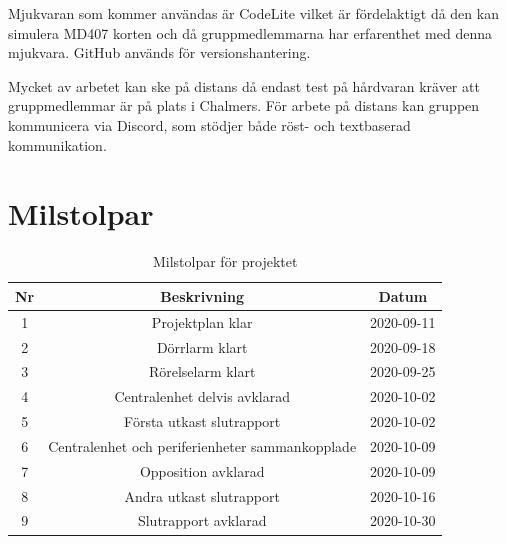 \documentclass[a4paper]{article}
\begin{document}
Mjukvaran som kommer användas är CodeLite vilket är fördelaktigt då den kan simulera MD407 korten och då gruppmedlemmarna har erfarenthet med denna mjukvara. GitHub används för versionshantering.

Mycket av arbetet kan ske på distans då endast test på hårdvaran kräver att gruppmedlemmar är på plats i Chalmers. För arbete på distans kan gruppen kommunicera via Discord, som stödjer både röst- och textbaserad kommunikation.

\section{Milstolpar}


\begin{table}[H]
    \centering
        \begin{tabular}{ |c|c|c| }\hline
            Nr & Beskrivning & Datum \\\hline\hline
            1 & Projektplan klar & 2020-09-11 \\\hline
            2 & Dörrlarm klart & 2020-09-18 \\\hline
            3 & Rörelselarm klart & 2020-09-25 \\\hline
            4 & Centralenhet delvis avklarad & 2020-10-02 \\\hline
            5 & Första utkast slutrapport & 2020-10-02 \\\hline
            6 & Centralenhet och periferienheter sammankopplade & 2020-10-09 \\\hline
            7 & Opposition avklarad & 2020-10-09 \\\hline
            8 & Andra utkast slutrapport & 2020-10-16 \\\hline
            9 & Slutrapport avklarad & 2020-10-30 \\\hline
        \end{tabular}
        \caption{Milstolpar för projektet}
        \label{table:milstolpar}
\end{table}
\end{document}
